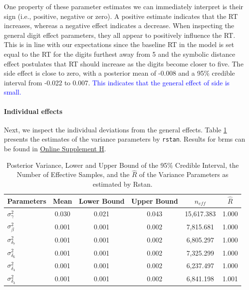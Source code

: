 \documentclass[
  english,
  doc,floatsintext]{apa6}
\let\oldparagraph\paragraph
\renewcommand{\paragraph}[1]{\oldparagraph{#1}\mbox{}}
\begin{document}
One property of these parameter estimates we can immediately interpret is their sign (i.e., positive, negative or zero). A positive estimate indicates that the RT increases, whereas a negative effect indicates a decrease. When inspecting the general digit effect parameters, they all appear to positively influence the RT. This is in line with our expectations since the baseline RT in the model is set equal to the RT for the digits furthest away from 5 and the symbolic distance effect postulates that RT should increase as the digits become closer to five. The side effect is close to zero, with a posterior mean of -0.008 and a 95\% credible interval from -0.022 to 0.007. \textcolor{blue}{This indicates that the general effect of side is small.}

\hypertarget{individual-effects-1}{%
\paragraph{Individual effects}\label{individual-effects-1}}

Next, we inspect the individual deviations from the general effects. Table \ref{tab:inddevtablelog} presents the estimates of the variance parameters by \texttt{rstan}. Results for brms can be found in \href{https://github.com/MyrtheV/Bayesian-Hierarchical-Modelling-An-Introduction-and-Reassessment/blob/main/H\%20-\%20Posterior\%20Distributions\%20Tables/Online-Supplement-H---Tables-with-Information-on-Posterior-Distributions.pdf}{Online Supplement H}.

\begin{table}[h]

\begin{center}
\begin{threeparttable}

\caption{\label{tab:inddevtablelog}Posterior Variance, Lower and Upper Bound of the 95\% Credible Interval, the Number of Effective Samples, and the $\hat{R}$ of the Variance Parameters as estimated by Rstan.}

\begin{tabular}{lccccc}
\toprule
Parameters & \multicolumn{1}{c}{Mean} & \multicolumn{1}{c}{Lower Bound} & \multicolumn{1}{c}{Upper Bound} & \multicolumn{1}{c}{$n_{eff}$} & \multicolumn{1}{c}{$\hat{R}$}\\
\midrule
$\sigma_{\gamma}^2$ & 0.030 & 0.021 & 0.043 & 15,617.383 & 1.000\\
$\sigma_{\beta}^2$ & 0.001 & 0.001 & 0.002 & 7,815.681 & 1.000\\
$\sigma_{\delta_{7}}^2$ & 0.001 & 0.001 & 0.002 & 6,805.297 & 1.000\\
$\sigma_{\delta_{6}}^2$ & 0.001 & 0.001 & 0.002 & 7,325.299 & 1.000\\
$\sigma_{\delta_{4}}^2$ & 0.001 & 0.001 & 0.002 & 6,237.497 & 1.000\\
$\sigma_{\delta_{3}}^2$ & 0.001 & 0.001 & 0.002 & 6,841.198 & 1.001\\
\bottomrule
\end{tabular}

\end{threeparttable}
\end{center}

\end{table}
\end{document}
